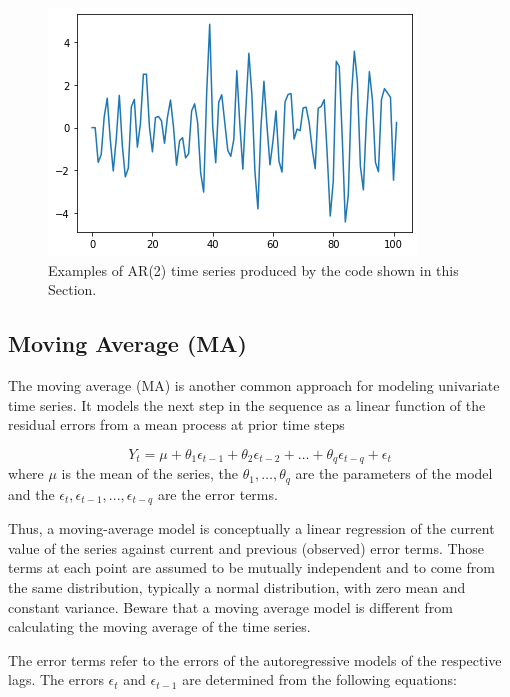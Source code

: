 \begin{figure}[htb]
	\centering
	\includegraphics[width=0.7\linewidth]{figures/ar2.png}
	\caption{Examples of AR(2) time series produced by the code shown in this Section.}
	\label{fig:ar2_example}
\end{figure}
   
\subsection{Moving Average (MA)}\label{moving-average-ma}

The moving average (MA) is another common approach for modeling univariate time series. It models the next step in the sequence as a linear function of the residual errors from a mean process at prior time steps

\begin{equation}
Y_t = \mu + \theta_1 \epsilon_{t-1} + \theta_2 \epsilon_{t-2} + \ldots + \theta_q \epsilon_{t-q} + \epsilon_t
\end{equation}
where \(\mu\) is the mean of the series, the \(\theta_1, \ldots, \theta_q\) are the parameters of the model and the \(\epsilon_t, \epsilon_{t−1},..., \epsilon_{t−q}\) are the error terms.

Thus, a moving-average model is conceptually a linear regression of the current value of the series against current and previous (observed) error terms. Those terms at each point are assumed to be mutually independent and to come from the same distribution, typically a normal distribution, with zero mean and constant variance. Beware that a moving average model is different from calculating the moving average of the time series.

The error terms refer to the errors of the autoregressive models of the respective lags. The errors \(\epsilon_t\) and \(\epsilon_{t-1}\) are determined from the following equations:

